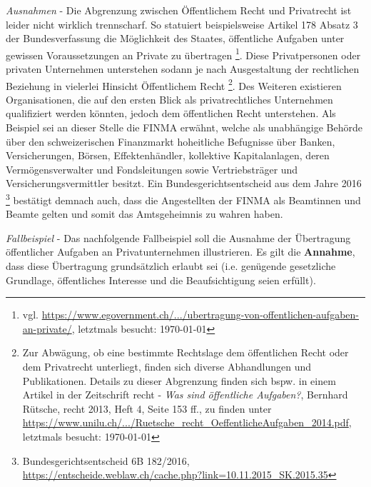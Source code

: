 \documentclass[a4paper,pointlessnumbers]{scrreprt}
\begin{document}
\textit{Ausnahmen} - Die Abgrenzung zwischen Öffentlichem Recht und Privatrecht ist leider nicht wirklich trennscharf. So statuiert beispielsweise Artikel 178 Absatz 3 der Bundesverfassung die Möglichkeit des Staates, öffentliche Aufgaben unter gewissen Voraussetzungen an Private zu übertragen \footnote{vgl. \href{https://www.egovernment.ch/de/dokumentation/rechtliche-fragen/zusammenarbeit/ubertragung-von-offentlichen-aufgaben-an-private/}{https://www.egovernment.ch/.../ubertragung-von-offentlichen-aufgaben-an-private/}, letztmals besucht: \today}. Diese Privatpersonen oder privaten Unternehmen unterstehen sodann je nach Ausgestaltung der rechtlichen Beziehung in vielerlei Hinsicht Öffentlichem Recht \footnote{Zur Abwägung, ob eine bestimmte Rechtslage dem öffentlichen Recht oder dem Privatrecht unterliegt, finden sich diverse Abhandlungen und Publikationen. Details zu dieser Abgrenzung finden sich bspw. in einem Artikel in der Zeitschrift recht - \textit{Was sind öffentliche Aufgaben?}, Bernhard Rütsche, recht 2013, Heft 4, Seite 153 ff., zu finden unter\\ \href{https://www.unilu.ch/fileadmin/fakultaeten/rf/ruetsche/dok/Ruetsche\_recht\_OeffentlicheAufgaben\_2014.pdf}{https://www.unilu.ch/.../Ruetsche\_recht\_OeffentlicheAufgaben\_2014.pdf}, letztmals besucht: \today}. Des Weiteren existieren Organisationen, die auf den ersten Blick als privatrechtliches Unternehmen qualifiziert werden könnten, jedoch dem öffentlichen Recht unterstehen. Als Beispiel sei an dieser Stelle die FINMA erwähnt, welche als unabhängige Behörde über den schweizerischen Finanzmarkt hoheitliche Befugnisse über Banken, Versicherungen, Börsen, Effektenhändler, kollektive Kapitalanlagen, deren Vermögensverwalter und Fondsleitungen sowie Vertriebsträger und Versicherungsvermittler besitzt. Ein Bundesgerichtsentscheid aus dem Jahre 2016 \footnote{Bundesgerichtsentscheid 6B 182/2016, \href{https://entscheide.weblaw.ch/cache.php?link=10.11.2015\_SK.2015.35}{https://entscheide.weblaw.ch/cache.php?link=10.11.2015\_SK.2015.35}} bestätigt demnach auch, dass die Angestellten der FINMA als Beamtinnen und Beamte gelten und somit das Amtsgeheimnis zu wahren haben.

\textit{Fallbeispiel} - Das nachfolgende Fallbeispiel soll die Ausnahme der Übertragung öffentlicher Aufgaben an Privatunternehmen illustrieren. Es gilt die \textbf{Annahme}, dass diese Übertragung grundsätzlich erlaubt sei (i.e. genügende gesetzliche Grundlage, öffentliches Interesse und die Beaufsichtigung seien erfüllt).
\end{document}
